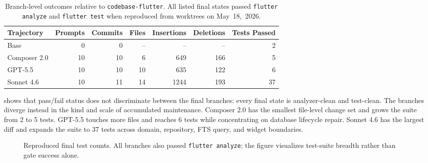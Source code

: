 \documentclass[11pt]{article}
\newcommand{\BaseBranch}{\texttt{codebase-\allowbreak flutter}}
\newcommand{\BaseLabel}{Base}
\newcommand{\ComposerLabel}{Composer 2.0}
\newcommand{\GPTLabel}{GPT-5.5}
\newcommand{\SonnetLabel}{Sonnet 4.6}
\newcommand{\AnalyzeCmd}{\texttt{flutter analyze}}
\newcommand{\TestCmd}{\texttt{flutter test}}
\newcommand{\GateCmds}{\AnalyzeCmd{} and \TestCmd{}}
\newcommand{\VerificationDate}{May~18,~2026}
\newcommand{\RepeatedPrompts}{10}
\newcommand{\ZeroCount}{0}
\newcommand{\BaseTests}{2}
\newcommand{\ComposerTests}{5}
\newcommand{\GPTTests}{6}
\newcommand{\SonnetTests}{37}
\newcommand{\ComposerPrompts}{\RepeatedPrompts}
\newcommand{\GPTPrompts}{\RepeatedPrompts}
\newcommand{\SonnetPrompts}{\RepeatedPrompts}
\newcommand{\ComposerCommits}{10}
\newcommand{\GPTCommits}{10}
\newcommand{\SonnetCommits}{11}
\newcommand{\ComposerFiles}{6}
\newcommand{\GPTFiles}{10}
\newcommand{\SonnetFiles}{14}
\newcommand{\ComposerInsertions}{649}
\newcommand{\GPTInsertions}{635}
\newcommand{\SonnetInsertions}{1244}
\newcommand{\ComposerDeletions}{166}
\newcommand{\GPTDeletions}{122}
\newcommand{\SonnetDeletions}{193}
\begin{document}
\begin{table}[t]
\centering
\small
\begin{tabular}{lrrrrrr}
\toprule
Trajectory & Prompts & Commits & Files & Insertions & Deletions & Tests Passed \\
\midrule
\BaseLabel{} & \ZeroCount{} & \ZeroCount{} & -- & -- & -- & \BaseTests{} \\
\ComposerLabel{} & \ComposerPrompts{} & \ComposerCommits{} & \ComposerFiles{} & \ComposerInsertions{} & \ComposerDeletions{} & \ComposerTests{} \\
\GPTLabel{} & \GPTPrompts{} & \GPTCommits{} & \GPTFiles{} & \GPTInsertions{} & \GPTDeletions{} & \GPTTests{} \\
\SonnetLabel{} & \SonnetPrompts{} & \SonnetCommits{} & \SonnetFiles{} & \SonnetInsertions{} & \SonnetDeletions{} & \SonnetTests{} \\
\bottomrule
\end{tabular}
\caption{Branch-level outcomes relative to \BaseBranch{}. All listed final states passed \GateCmds{} when reproduced from worktrees on \VerificationDate{}.}
\label{tab:branch-results}
\end{table}

 shows that pass/fail status does not discriminate between the final branches: every final state is analyzer-clean and test-clean. The branches diverge instead in the kind and scale of accumulated maintenance. \ComposerLabel{} has the smallest file-level change set and grows the suite from \BaseTests{} to \ComposerTests{} tests. \GPTLabel{} touches more files and reaches \GPTTests{} tests while concentrating on database lifecycle repair. \SonnetLabel{} has the largest diff and expands the suite to \SonnetTests{} tests across domain, repository, FTS query, and widget boundaries.

\begin{figure}[t]
\centering
{}
\caption{Reproduced final test counts. All branches also passed \AnalyzeCmd{}; the figure visualizes test-suite breadth rather than gate success alone.}
\label{fig:test-counts}
\end{figure}
\end{document}
